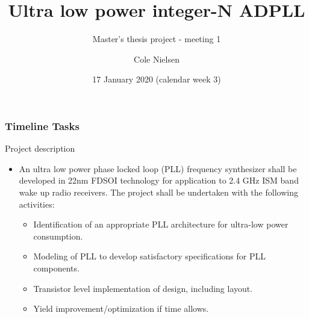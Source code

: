 \documentclass[t, screen, aspectratio=43]{beamer}
\title[Short title]{Ultra low power integer-N ADPLL}
\subtitle{Master's thesis project - meeting 1}
\author[C Nielsen]{Cole Nielsen}
\institute[NTNU]{Department of Electronic Systems, NTNU}
\date{17 January 2020 (calendar week 3)}
\begin{document}
\begin{frame}
	\titlepage%
\end{frame}



\begin{frame}
	\frametitle{Timeline Tasks}
	\begin{block}{Project description}
		\begin{itemize}
			\footnotesize
			\item An ultra low power phase locked loop (PLL) frequency synthesizer shall be developed in 22nm FDSOI technology for application to 2.4 GHz ISM band wake up radio receivers. The project shall be undertaken with the following activities:
			\begin{itemize}
				\footnotesize
				\item Identification of an appropriate PLL architecture for ultra-low power consumption.
				\item Modeling of PLL to develop satisfactory specifications for PLL components.
				\item Transistor level implementation of design, including layout.
				\item Yield improvement/optimization if time allows.
			\end{itemize} 
		\end{itemize}    
	\end{block}
\end{frame}


\end{document}
